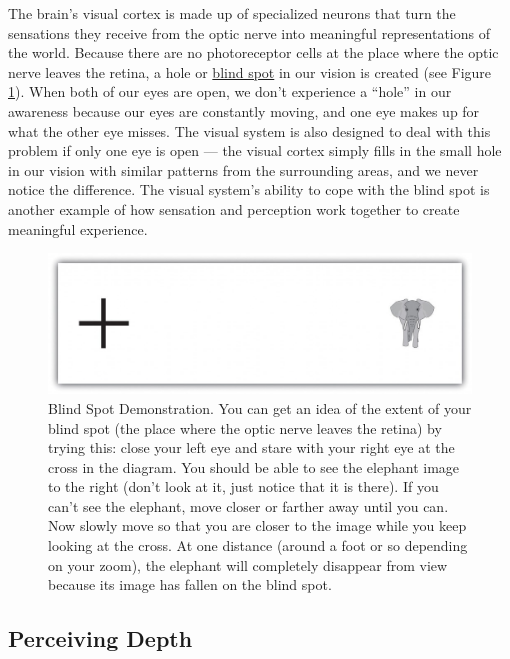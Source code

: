 \documentclass[
]{krantz}
\begin{document}
The brain's visual cortex is made up of specialized neurons that turn the sensations they receive from the optic nerve into meaningful representations of the world. Because there are no photoreceptor cells at the place where the optic nerve leaves the retina, a hole or \protect\hyperlink{blind-spot}{blind spot} in our vision is created (see Figure \ref{fig:blindspot}). When both of our eyes are open, we don't experience a ``hole'' in our awareness because our eyes are constantly moving, and one eye makes up for what the other eye misses. The visual system is also designed to deal with this problem if only one eye is open --- the visual cortex simply fills in the small hole in our vision with similar patterns from the surrounding areas, and we never notice the difference. The visual system's ability to cope with the blind spot is another example of how sensation and perception work together to create meaningful experience.

\begin{figure}

{\centering \includegraphics[width=0.6\linewidth]{images/ch2/fig3} 

}

\caption{Blind Spot Demonstration. You can get an idea of the extent of your blind spot (the place where the optic nerve leaves the retina) by trying this: close your left eye and stare with your right eye at the cross in the diagram. You should be able to see the elephant image to the right (don’t look at it, just notice that it is there). If you can’t see the elephant, move closer or farther away until you can. Now slowly move so that you are closer to the image while you keep looking at the cross. At one distance (around a foot or so depending on your zoom), the elephant will completely disappear from view because its image has fallen on the blind spot.}\label{fig:blindspot}
\end{figure}

\hypertarget{perceiving-depth}{%
\subsection*{Perceiving Depth}\label{perceiving-depth}}
\end{document}
